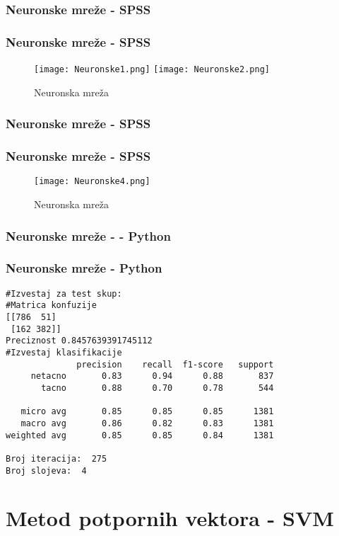 \documentclass{beamer}
\begin{document}
\subsubsection*{Neuronske mreže - SPSS}
\begin{frame}[fragile]
\frametitle{Neuronske mreže - SPSS}

\begin{figure}[ht!]
    \centering
    \texttt{[image: Neuronske1.png]}
    \texttt{[image: Neuronske2.png]}
    \caption{Neuronska mreža}
    \label{fig:Neuronske1}
\end{figure}
\end{frame}

\subsubsection*{Neuronske mreže - SPSS}
\begin{frame}[fragile]
\frametitle{Neuronske mreže - SPSS}

\begin{figure}[ht!]
    \centering
    \texttt{[image: Neuronske4.png]}
    \caption{Neuronska mreža}
    \label{fig:Neuronske1}
\end{figure}
\end{frame}

\subsubsection*{Neuronske mreže - - Python}
\begin{frame}[fragile]
\frametitle{Neuronske mreže - Python}

\begin{lstlisting}
#Izvestaj za test skup:
#Matrica konfuzije
[[786  51]
 [162 382]]
Preciznost 0.8457639391745112
#Izvestaj klasifikacije
              precision    recall  f1-score   support
     netacno       0.83      0.94      0.88       837
       tacno       0.88      0.70      0.78       544

   micro avg       0.85      0.85      0.85      1381
   macro avg       0.86      0.82      0.83      1381
weighted avg       0.85      0.85      0.84      1381

Broj iteracija:  275
Broj slojeva:  4

\end{lstlisting}
\end{frame}


\section{Metod potpornih vektora - SVM}
\end{document}
